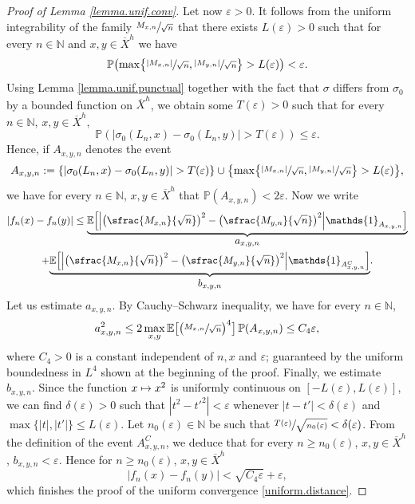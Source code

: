 \documentclass[JEP,XML,SOM,Unicode,published]{cedram}
\newcommand\mto{\mathchoice{\longmapsto}{\mapsto}{\mapsto}{\mapsto}}
\let\epsilon\varepsilon
\let\ts\textstyle
\theoremstyle{plain}
\theoremstyle{definition}
\newcommand\E{\mathbb{E}}
\newcommand\p{\mathbb{P}}
\newcommand\N{\mathbb{N}}
\begin{document}
\begin{proof}[Proof of Lemma \ref{lemma.unif.conv}]
Let now $\epsilon>0$. It follows from the uniform integrability of the family $\sfrac{M_{x,n}}{\sqrt{n}}$ that there exists $L(\epsilon)>0$ such that for every $n\in \N$ and $x,y\in \overline{X}^h$ we have
\[
\p\bigl(\max\bigl\{\sfrac{|M_{x,n}|}{\sqrt{n}}, \sfrac{|M_{y,n}|}{\sqrt{n}}\bigr\}>L(\epsilon)\bigr)<\epsilon.
\]
Using Lemma \ref{lemma.unif.punctual} together with the fact that $\sigma$ differs from $\sigma_0$ by a bounded function on $\overline{X}^h$, we obtain some $T(\epsilon)>0$ such that for every $n\in \N$, $x,y\in \overline{X}^h$,
\begin{equation}\label{eq.botim1}
\p(|\sigma_0(L_n, x)-\sigma_0(L_n,y)|>T(\epsilon))\leq \epsilon.
\end{equation}
Hence, if $A_{x,y,n}$ denotes the event
\[
A_{x,y,n}:= \left\{|\sigma_0(L_n, x)-\sigma_0(L_n, y)|>T(\epsilon) \right\} \cup \bigl\{\max\bigl\{\sfrac{|M_{x,n}|}{\sqrt{n}}, \sfrac{|M_{y,n}|}{\sqrt{n}}\bigr\}> L(\epsilon)\bigr\},
\]
we have for every $n\in \N$, $x,y\in \overline{X}^h$ that
$\p(A_{x,y,n})<2\epsilon$. Now we write
\begin{multline*}
|f_n(x)-f_n(y)|\leq \underset{\ts a_{x,y,n}}{\underbrace{ \E\Bigl[\Bigl|\bigl(\sfrac{M_{x,n}}{\sqrt{n}}\bigr)^2 - \bigl(\sfrac{M_{y,n}}{\sqrt{n}}\bigr)^2\Bigr|\mathds{1}_{A_{x,y,n}}\Bigr]}}\\
+ \underset{\ts b_{x,y,n}}{\underbrace{ \E\Bigl[\Bigl|\bigl(\sfrac{M_{x,n}}{\sqrt{n}}\bigr)^2 - \bigl(\sfrac{M_{y,n}}{\sqrt{n}}\bigr)^2\Bigr|\mathds{1}_{A_{x,y,n}^C}\Bigr]}}.
\end{multline*}
Let us estimate $a_{x,y,n}$. By Cauchy--Schwarz inequality, we have for every $n\in \N$,
\[
a_{x,y,n}^2 \leq 2\max_{x,y}{\E\bigl[\bigl(\sfrac{M_{x,n}}{\sqrt{n}}\bigr)^4\bigr]} \,\p(A_{x,y,n})\leq C_4\epsilon,
\]
where $C_4>0$ is a constant independent of $n, x$ and $\epsilon$; guaranteed by the uniform boundedness in $L^4$ shown at the beginning of the proof. Finally, we estimate $b_{x,y,n}$. Since the function $x\mto x^2$ is uniformly continuous on $[-L(\epsilon), L(\epsilon)]$, we can find $\delta(\epsilon)>0$ such that $|t^2-t'^2|<\epsilon$ whenever $|t-t'|<\delta(\epsilon)$ and $\max\{|t|,|t'|\}\leq L(\epsilon)$. Let $n_0(\epsilon)\in \N$ be such that $\sfrac{T(\epsilon)}{\sqrt{n_0(\epsilon)}}<\delta(\epsilon)$. From the definition of the event $A_{x,y,n}^C$, we deduce that for every $n\geq n_0(\epsilon)$, $x,y\in \overline{X}^h$, $b_{x,y,n}<\epsilon$.
Hence for $n\geq n_0(\epsilon)$, $x,y\in \overline{X}^h$
\[
|f_n(x)-f_n(y)|< \sqrt{C_4 \epsilon}+\epsilon,
\]
which finishes the proof of the uniform convergence \eqref{uniform.distance}. \end{proof}
\end{document}
